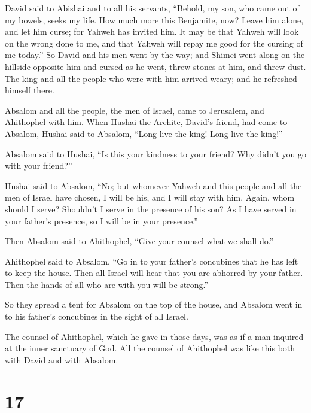  David said to Abishai and to all his servants, ``Behold,
my son, who came out of my bowels, seeks my life. How much more this
Benjamite, now? Leave him alone, and let him curse; for Yahweh has
invited him.  It may be that Yahweh will look on the
wrong done to me, and that Yahweh will repay me good for the cursing of
me today.''  So David and his men went by the way; and
Shimei went along on the hillside opposite him and cursed as he went,
threw stones at him, and threw dust.  The king and all
the people who were with him arrived weary; and he refreshed himself
there.

 Absalom and all the people, the men of Israel, came to
Jerusalem, and Ahithophel with him.  When Hushai the
Archite, David's friend, had come to Absalom, Hushai said to Absalom,
``Long live the king! Long live the king!''

 Absalom said to Hushai, ``Is this your kindness to your
friend? Why didn't you go with your friend?''

 Hushai said to Absalom, ``No; but whomever Yahweh and
this people and all the men of Israel have chosen, I will be his, and I
will stay with him.  Again, whom should I serve?
Shouldn't I serve in the presence of his son? As I have served in your
father's presence, so I will be in your presence.''

 Then Absalom said to Ahithophel, ``Give your counsel
what we shall do.''

 Ahithophel said to Absalom, ``Go in to your father's
concubines that he has left to keep the house. Then all Israel will hear
that you are abhorred by your father. Then the hands of all who are with
you will be strong.''

 So they spread a tent for Absalom on the top of the
house, and Absalom went in to his father's concubines in the sight of
all Israel.

 The counsel of Ahithophel, which he gave in those days,
was as if a man inquired at the inner sanctuary of God. All the counsel
of Ahithophel was like this both with David and with Absalom.

\hypertarget{section-16}{%
\section{17}\label{section-16}}

